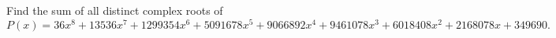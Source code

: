 Find the sum of all distinct complex roots of
\[P(x)=36x^8+13536x^7+1299354x^6+5091678x^5+9066892x^4+9461078x^3+6018408x^2+2168078x+349690.\]
